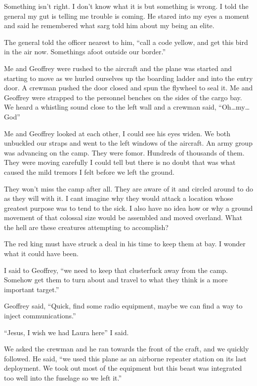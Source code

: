Something isn't right. I don't know what it is but something is wrong. I told the general my gut is telling me trouble is coming. He stared into my eyes a moment and said he remembered what sarg told him about my being an elite.

The general told the officer nearest to him, ``call a code yellow, and get this bird in the air now. Somethings afoot outside our border.''

Me and Geoffrey were rushed to the aircraft and the plane was started and starting to move as we hurled ourselves up the boarding ladder and into the entry door. A crewman pushed the door closed and spun the flywheel to seal it. Me and Geoffrey were strapped to the personnel benches on the sides of the cargo bay. We heard a whistling sound close to the left wall and a crewman said, ``Oh\dots my\dots God''

Me and Geoffrey looked at each other, I could see his eyes widen. We both unbuckled our straps and went to the left windows of the aircraft. An army group was advancing on the camp. They were fomor. Hundreds of thousands of them. They were moving carefully I could tell but there is no doubt that was what caused the mild tremors I felt before we left the ground.

They won't miss the camp after all. They are aware of it and circled around to do as they will with it. I cant imagine why they would attack a location whose greatest purpose was to tend to the sick. I also have no idea how or why a ground movement of that colossal size would be assembled and moved overland. What the hell are these creatures attempting to accomplish? 

The red king must have struck a deal in his time to keep them at bay. I wonder what it could have been.

I said to Geoffrey, ``we need to keep that clusterfuck away from the camp. Somehow get them to turn about and travel to what they think is a more important target.''

Geoffrey said, ``Quick, find some radio equipment, maybe we can find a way to inject communications.''

``Jesus, I wish we had Laura here'' I said.

We asked the crewman and he ran towards the front of the craft, and we quickly followed. He said, ``we used this plane as an airborne repeater station on its last deployment. We took out most of the equipment but this beast was integrated too well into the fuselage so we left it.''

